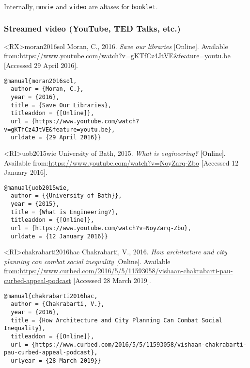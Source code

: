 \documentclass[10pt,a4paper]{article}
\newenvironment{info}{%
  \begin{list}{\makebox[2em][c]{\faInfoCircle}}{%
    \setlength{\leftmargin}{2em}
    \setlength{\labelwidth}{2em}
    \setlength{\labelsep}{0pt}}
}{\end{list}}
\begin{document}
\begin{info}\item Internally, \texttt{movie} and \texttt{video} are aliases for \texttt{booklet}.\end{info}

\subsubsection*{Streamed video (YouTube, TED Talks, etc.)}

\begin{bibexbox}<RX>{moran2016sol}
  Moran, C., 2016. \emph{Save our libraries} [Online]. Available from:\@ \url{https://www.youtube.com/watch?v=gKTfCz4JtVE&feature=youtu.be} [Accessed 29 April 2016].
  \tcblower
\begin{Verbatim}
@manual{moran2016sol,
  author = {Moran, C.},
  year = {2016},
  title = {Save Our Libraries},
  titleaddon = {[Online]},
  url = {https://www.youtube.com/watch?v=gKTfCz4JtVE&feature=youtu.be},
  urldate = {29 April 2016}}
\end{Verbatim}
\end{bibexbox}

\begin{bibexbox}<RI>{uob2015wie}
   University of Bath, 2015. \emph{What is engineering?} [Online]. Available from:\@ \url{https://www.youtube.com/watch?v=NoyZarq-Zbo} [Accessed 12 January 2016].
  \tcblower
\begin{Verbatim}
@manual{uob2015wie,
  author = {{University of Bath}},
  year = {2015},
  title = {What is Engineering?},
  titleaddon = {[Online]},
  url = {https://www.youtube.com/watch?v=NoyZarq-Zbo},
  urldate = {12 January 2016}}
\end{Verbatim}
\end{bibexbox}

\begin{bibexbox}<RI>{chakrabarti2016hac}
   Chakrabarti, V., 2016. \emph{How architecture and city planning can combat social inequality} [Online]. Available from:\@ \url{https://www.curbed.com/2016/5/5/11593058/vishaan-chakrabarti-pau-curbed-appeal-podcast} [Accessed 28 March 2019].
  \tcblower
\begin{Verbatim}
@manual{chakrabarti2016hac,
  author = {Chakrabarti, V.},
  year = {2016},
  title = {How Architecture and City Planning Can Combat Social Inequality},
  titleaddon = {[Online]},
  url = {https://www.curbed.com/2016/5/5/11593058/vishaan-chakrabarti-pau-curbed-appeal-podcast},
  urlyear = {28 March 2019}}
\end{Verbatim}
\end{bibexbox}
\end{document}
